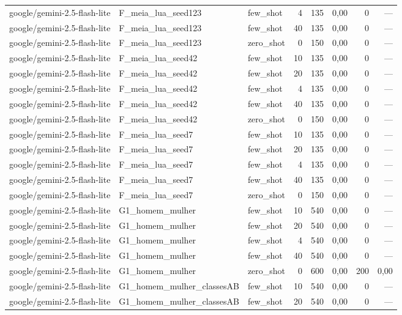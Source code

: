 \begin{table}[htbp]
\begin{tabular}{lllrrrrr}
google/gemini-2.5-flash-lite & F\_meia\_lua\_seed123 & few\_shot & 4 & 135 & 0,00 & 0 & — \\
google/gemini-2.5-flash-lite & F\_meia\_lua\_seed123 & few\_shot & 40 & 135 & 0,00 & 0 & — \\
google/gemini-2.5-flash-lite & F\_meia\_lua\_seed123 & zero\_shot & 0 & 150 & 0,00 & 0 & — \\
google/gemini-2.5-flash-lite & F\_meia\_lua\_seed42 & few\_shot & 10 & 135 & 0,00 & 0 & — \\
google/gemini-2.5-flash-lite & F\_meia\_lua\_seed42 & few\_shot & 20 & 135 & 0,00 & 0 & — \\
google/gemini-2.5-flash-lite & F\_meia\_lua\_seed42 & few\_shot & 4 & 135 & 0,00 & 0 & — \\
google/gemini-2.5-flash-lite & F\_meia\_lua\_seed42 & few\_shot & 40 & 135 & 0,00 & 0 & — \\
google/gemini-2.5-flash-lite & F\_meia\_lua\_seed42 & zero\_shot & 0 & 150 & 0,00 & 0 & — \\
google/gemini-2.5-flash-lite & F\_meia\_lua\_seed7 & few\_shot & 10 & 135 & 0,00 & 0 & — \\
google/gemini-2.5-flash-lite & F\_meia\_lua\_seed7 & few\_shot & 20 & 135 & 0,00 & 0 & — \\
google/gemini-2.5-flash-lite & F\_meia\_lua\_seed7 & few\_shot & 4 & 135 & 0,00 & 0 & — \\
google/gemini-2.5-flash-lite & F\_meia\_lua\_seed7 & few\_shot & 40 & 135 & 0,00 & 0 & — \\
google/gemini-2.5-flash-lite & F\_meia\_lua\_seed7 & zero\_shot & 0 & 150 & 0,00 & 0 & — \\
google/gemini-2.5-flash-lite & G1\_homem\_mulher & few\_shot & 10 & 540 & 0,00 & 0 & — \\
google/gemini-2.5-flash-lite & G1\_homem\_mulher & few\_shot & 20 & 540 & 0,00 & 0 & — \\
google/gemini-2.5-flash-lite & G1\_homem\_mulher & few\_shot & 4 & 540 & 0,00 & 0 & — \\
google/gemini-2.5-flash-lite & G1\_homem\_mulher & few\_shot & 40 & 540 & 0,00 & 0 & — \\
google/gemini-2.5-flash-lite & G1\_homem\_mulher & zero\_shot & 0 & 600 & 0,00 & 200 & 0,00 \\
google/gemini-2.5-flash-lite & G1\_homem\_mulher\_classesAB & few\_shot & 10 & 540 & 0,00 & 0 & — \\
google/gemini-2.5-flash-lite & G1\_homem\_mulher\_classesAB & few\_shot & 20 & 540 & 0,00 & 0 & — \\

\end{tabular}
\end{table}

